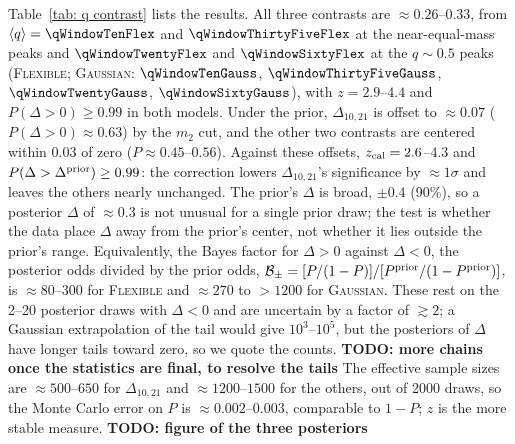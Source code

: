 \documentclass[%
 reprint,
 amsmath,amssymb,
 aps,
 prl,
 nofootinbib,nobibnotes,
 floatfix,
]{revtex4-2}
\newcommand{\todo}[1]{{\color{Blue}\bf TODO: #1}}
\newcommand{\flexiblespins}{\textsc{Flexible}\xspace}
\newcommand{\gaussianspins}{\textsc{Gaussian}\xspace}
\newcommand{\featTen}{10\xspace}
\newcommand{\featTwenty}{21\xspace}
\begin{document}
Table~\ref{tab: q contrast} lists the results. All three contrasts are $\approx 0.26$--$0.33$, from $\langle q \rangle = \qWindowTenFlex$ and $\qWindowThirtyFiveFlex$ at the near-equal-mass peaks and $\qWindowTwentyFlex$ and $\qWindowSixtyFlex$ at the $q \sim 0.5$ peaks (\flexiblespins; \gaussianspins: $\qWindowTenGauss$, $\qWindowThirtyFiveGauss$, $\qWindowTwentyGauss$, $\qWindowSixtyGauss$), with $z = 2.9$--$4.4$ and $P(\Delta > 0) \geq 0.99$ in both models. Under the prior, $\Delta_{\featTen,\featTwenty}$ is offset to $\approx 0.07$ ($P(\Delta > 0) \approx 0.63$) by the $m_2$ cut, and the other two contrasts are centered within $0.03$ of zero ($P \approx 0.45$--$0.56$). Against these offsets, $z_{\rm cal} = 2.6$--$4.3$ and $P(\Delta > \Delta^{\rm prior}) \geq 0.99$: the correction lowers $\Delta_{\featTen,\featTwenty}$'s significance by $\approx 1\sigma$ and leaves the others nearly unchanged. The prior's $\Delta$ is broad, $\pm 0.4$ (90\%), so a posterior $\Delta$ of $\approx 0.3$ is not unusual for a single prior draw; the test is whether the data place $\Delta$ away from the prior's center, not whether it lies outside the prior's range. Equivalently, the Bayes factor for $\Delta > 0$ against $\Delta < 0$, the posterior odds divided by the prior odds, $\mathcal{B}_{\pm} = [P/(1-P)]/[P^{\rm prior}/(1-P^{\rm prior})]$, is $\approx 80$--$300$ for \flexiblespins and $\approx 270$ to $> 1200$ for \gaussianspins. These rest on the 2--20 posterior draws with $\Delta < 0$ and are uncertain by a factor of $\gtrsim 2$; a Gaussian extrapolation of the tail would give $10^3$--$10^5$, but the posteriors of $\Delta$ have longer tails toward zero, so we quote the counts. \todo{more chains once the statistics are final, to resolve the tails} The effective sample sizes are $\approx 500$--$650$ for $\Delta_{\featTen,\featTwenty}$ and $\approx 1200$--$1500$ for the others, out of 2000 draws, so the Monte Carlo error on $P$ is $\approx 0.002$--$0.003$, comparable to $1 - P$; $z$ is the more stable measure. \todo{figure of the three posteriors}
\end{document}
